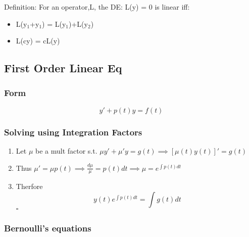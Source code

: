 \documentclass[11pt]{article}
\begin{document}
  Definition: For an operator,L, the DE: L(y) = 0 is linear iff:
\begin{itemize}
\item L(y$_1$+y$_1$) = L(y$_1$)+L(y$_2$)
\item L(cy) = cL(y)
\end{itemize}
\subsection{First Order Linear Eq}
\label{sec-9.1}

\subsubsection{Form}
\label{sec-9.1.1}

    \begin{equation}
    y' + p(t)y = f(t)
    \end{equation}
\subsubsection{Solving using Integration Factors}
\label{sec-9.1.2}

\begin{enumerate}
\item Let $\mu$ be a mult factor s.t. $\mu y' + \mu'y=g(t) \implies [\mu(t) y(t)]'= g(t)$
\item Thus $\mu'=\mu p(t) \implies \frac{d\mu}{\mu}=p(t)dt \implies
       \mu = e^{\int p(t)dt }$
\item Therfore
       \begin{equation}
       y(t)e^{\int p(t)dt}=\int g(t)dt
       \end{equation} $\square$
\end{enumerate}
\subsubsection{Bernoulli's equations}
\label{sec-9.1.3}
\end{document}
